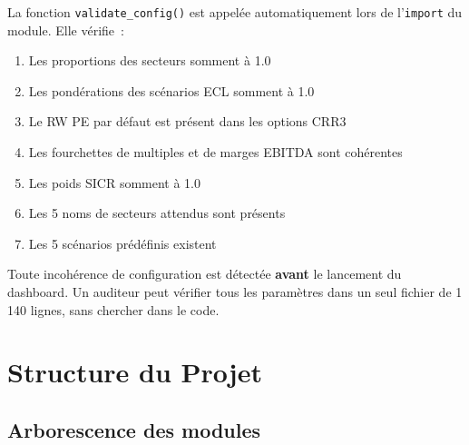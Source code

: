 \documentclass[12pt,a4paper]{article}
\begin{document}
La fonction \texttt{validate\_config()} est appel\'ee automatiquement lors de l'\texttt{import} du module. Elle v\'erifie~:

\begin{enumerate}[noitemsep]
    \item Les proportions des secteurs somment \`a 1.0
    \item Les pond\'erations des sc\'enarios ECL somment \`a 1.0
    \item Le RW PE par d\'efaut est pr\'esent dans les options CRR3
    \item Les fourchettes de multiples et de marges EBITDA sont coh\'erentes
    \item Les poids SICR somment \`a 1.0
    \item Les 5 noms de secteurs attendus sont pr\'esents
    \item Les 5 sc\'enarios pr\'ed\'efinis existent
\end{enumerate}

\begin{interpretbox}
Toute incoh\'erence de configuration est d\'etect\'ee \textbf{avant} le lancement du dashboard. Un auditeur peut v\'erifier tous les param\`etres dans un seul fichier de 1\,140 lignes, sans chercher dans le code.
\end{interpretbox}


\section{Structure du Projet}
\label{sec:structure}

\subsection{Arborescence des modules}
\end{document}
